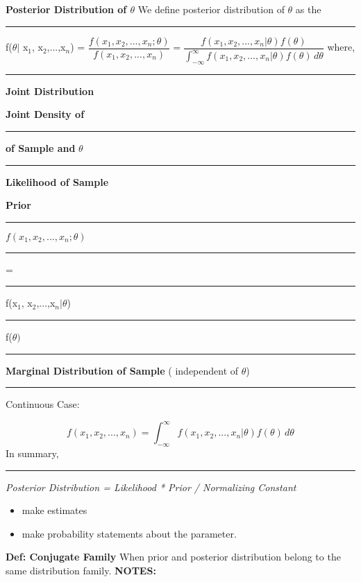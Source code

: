 \documentclass[]{article}
\begin{document}
\newpage
\Large\textbf{Posterior Distribution of $\theta$}
\newline
We define posterior distribution of $\theta$ as the 
\newline
\newline\Large\rule{2.2cm}{0pt}   f($\theta |$ x$_1$, x$_2$,...,x$_n$) = $\dfrac{f(x_1, x_2,...,x_n ; \theta)}{ f(x_1, x_2,...,x_n)} = \dfrac{f(x_1, x_2,...,x_n | \theta)f(\theta)}{ \int_{-\infty}^{\infty}  f(x_1, x_2,...,x_n | \theta)f(\theta)  \,d\theta  }$
\newline
\newline where,
\newline
\newline  \Large\rule{2cm}{0pt}  \textbf{Joint Distribution } \Large\rule{0cm}{0pt} \textbf{Joint Density of } 
\newline  \Large\rule{2cm}{0pt}  \textbf{of Sample and} $\theta$ \Large\rule{.65cm}{0pt} \textbf{Likelihood of Sample} \Large\rule{0cm}{0pt} \textbf{Prior}
\newline\Large\rule{2cm}{0pt} $f(x_1, x_2,...,x_n ; \theta)$     \Large\rule{.3cm}{0pt} =   \Large\rule{.5cm}{0pt}  f(x$_1$, x$_2$,...,x$_n | \theta$)  \Large\rule{1.5cm}{0pt}   f($\theta)$ 
\newline
\newline \Large\rule{2cm}{0pt}  \textbf{Marginal Distribution of Sample} ( independent of $\theta$)
\newline  \Large\rule{2cm}{0pt}  Continuous Case:
\Large\rule{0cm}{0pt}  \[f(x_1, x_2,...,x_n ) =  \int_{-\infty}^{\infty}  f(x_1, x_2,...,x_n | \theta)f(\theta)  \,d\theta \]
In summary,
\newline \Large\rule{2.5cm}{0pt} \textit{Posterior Distribution = Likelihood * Prior / Normalizing Constant}
\newline
\newline {}
\begin{itemize}
	\item make estimates
	\item make probability statements about the parameter.
\end{itemize}
\Large\textbf{Def: Conjugate Family}
\newline When prior and posterior distribution belong to the same distribution family. 
\newline
\newline
\Large\textbf{NOTES:}
\end{document}
